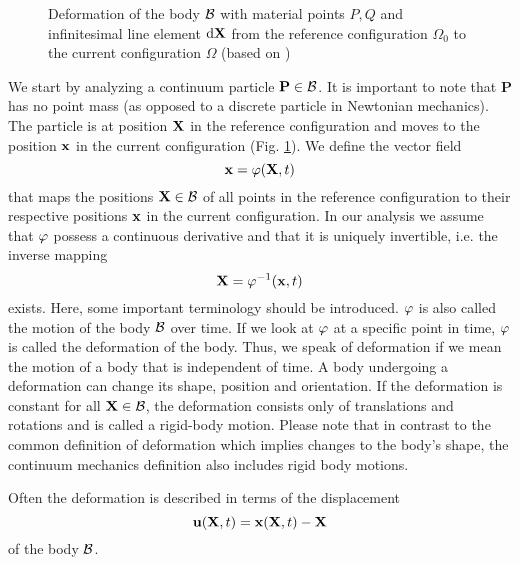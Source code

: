 \begin{figure}
   \centering   
	\caption{Deformation of the body $\mathcal{B} $ with material points $P,Q$ and infinitesimal line element $\textnormal{d} \mathbf {X }$ from the reference configuration $\Omega_0$ to the current configuration $\Omega$ (based on \cite{Wikipedi2013})}
\label{BodyDeformation}
\end{figure}

We start by analyzing a continuum particle $\mathbf P \in \mathcal{B} $. It is important to note that $\mathbf  P$ has no point mass (as opposed to a discrete particle in Newtonian mechanics). The particle is at position $\mathbf {X} $ in the reference configuration and moves to the position $\mathbf {x} $ in the current configuration (Fig. \ref{BodyDeformation}). We define the vector field 
\begin{equation}
\mathbf {x}  = \varphi (\mathbf {X} ,t)
\end{equation}
that maps the positions $\mathbf {X}  \in \mathcal{B}$ of all points in the reference configuration to their respective positions $\mathbf {x} $ in the current configuration. In our analysis we assume that $\varphi$ possess a continuous derivative and that it is uniquely invertible, i.e. the inverse mapping
\begin{equation}
\mathbf {X}  = \varphi^{-1} (\mathbf {x} ,t)
\end{equation}
exists. Here, some important terminology should be introduced. $\varphi$ is also called the motion of the body $\mathcal{B} $ over time. If we look at $\varphi$ at a specific point in time, $\varphi$ is called the deformation of the body. Thus, we speak of deformation if we mean the motion of a body that is independent of time. A body undergoing a deformation can change its shape, position and orientation. If the deformation is constant for all $\mathbf {X}  \in \mathcal{B} $, the deformation consists only of translations and rotations and is called a rigid-body motion. Please note that in contrast to the common definition of deformation which implies changes to the body's shape, the continuum mechanics definition also includes rigid body motions.

Often the deformation is described in terms of the displacement
\begin{equation}
\mathbf {u} (\mathbf {X} ,t)=\mathbf {x} (\mathbf {X} ,t)-\mathbf {X} 
\label{DisplacementDefinition}
\end{equation}
of the body $\mathcal{B} $. 

